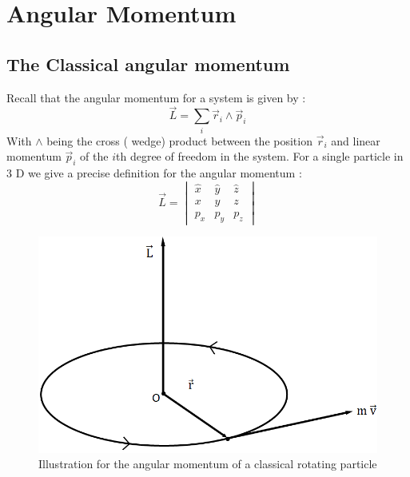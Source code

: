 \chapter{Angular Momentum}
\section{The Classical angular momentum}
Recall that the angular momentum for a system is given by :
\begin{equation}
\vec{L} = \sum_i \vec{ r}_i \wedge \vec{p}_i 
\end{equation}
With $ \wedge$ being the cross ( wedge) product between the position $\vec{r}_i$ and linear momentum $ \vec{p}_i$ of the $i$th degree of freedom in the system. For a single particle in 3 D we give a precise definition for the angular momentum :
\begin{equation}
\vec{L}= \begin{vmatrix}
\hat{x}& \hat{y} & \hat{z} \\ x& y & z \\ p_x & p_y& p_z
\end{vmatrix}
\end{equation}
\begin{figure}[h!]
	\centering
	\includegraphics*[scale=0.4]{./figures/ang}
	\caption{Illustration for the angular momentum of a classical rotating particle }
\end{figure}
